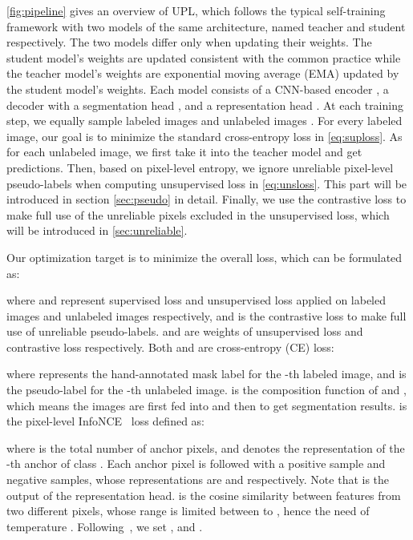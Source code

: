 \documentclass[10pt, twocolumn, letterpaper]{article}
\begin{document}
\cref{fig:pipeline} gives an overview of UPL, which follows the typical self-training framework with two models of the same architecture, named teacher and student respectively.
The two models differ only when updating their weights.
The student model's weights  are updated consistent with the common practice while the teacher model's weights  are exponential moving average (EMA) updated by the student model's weights.
Each model consists of a CNN-based encoder , a decoder with a segmentation head , and a representation head .
At each training step, we equally sample  labeled images  and  unlabeled images .
For every labeled image, our goal is to minimize the standard cross-entropy loss in \cref{eq:suploss}.
As for each unlabeled image, we first take it into the teacher model and get predictions.
Then, based on pixel-level entropy, we ignore unreliable pixel-level pseudo-labels when computing unsupervised loss in \cref{eq:unsloss}.
This part will be introduced in section \cref{sec:pseudo} in detail.
Finally, we use the contrastive loss to make full use of the unreliable pixels excluded in the unsupervised loss, which will be introduced in \cref{sec:unreliable}.


Our optimization target is to minimize the overall loss, which can be formulated as:

where  and  represent supervised loss and unsupervised loss applied on labeled images and unlabeled images respectively, and  is the contrastive loss to make full use of unreliable pseudo-labels. 
 and  are weights of unsupervised loss and contrastive loss respectively.
Both  and  are cross-entropy (CE) loss:


where  represents the hand-annotated mask label for the -th labeled image, and  is the pseudo-label for the -th unlabeled image.
 is the composition function of  and , which means the images are first fed into  and then  to get segmentation results.
 is the pixel-level InfoNCE~\cite{infonce} loss defined as:

where  is the total number of anchor pixels, and  denotes the representation of the -th anchor of class .
Each anchor pixel is followed with a positive sample and  negative samples, whose representations are  and  respectively.
Note that  is the output of the representation head.
 is the cosine similarity between features from two different pixels, whose range is limited between  to , hence the need of temperature .
Following~\cite{reco}, we set ,  and .
\end{document}
